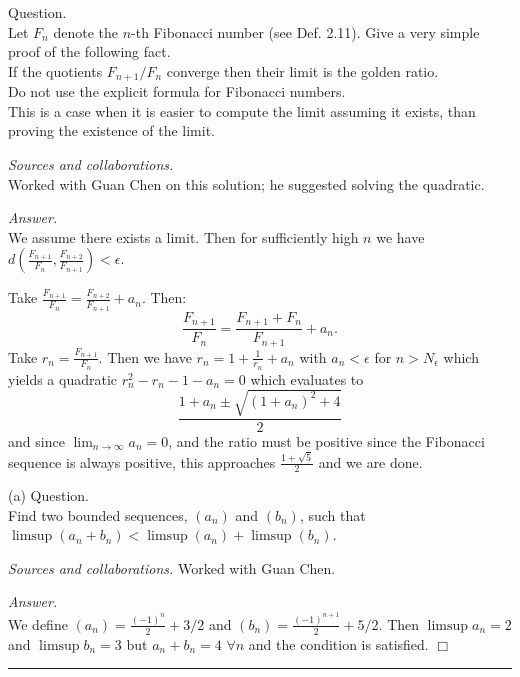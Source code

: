 \documentclass{amsart}
\begin{document}
\vspace{0.6cm}

\newpage
\Large
{}      %

 Question. \\
Let $F_n$ denote the $n$-th Fibonacci number (see Def. 2.11). Give a very simple proof of the following fact. \\
If the quotients $F_{n+1}/F_n$ converge then their limit is the golden ratio.\\
Do not use the explicit formula for Fibonacci numbers. \\
This is a case when it is easier to compute the limit assuming it exists, than proving the existence of the limit.

\medskip\noindent
\emph{Sources and collaborations.}\\
Worked with Guan Chen on this solution; he suggested solving the quadratic.

\medskip\noindent
\emph{Answer.}\\
We assume there exists a limit. Then for sufficiently high $n$ we have $d(\frac{F_{n+1}}{F_n},\frac{F_{n+2}}{F_{n+1}})<\epsilon$.

\medskip \noindent Take $\frac{F_{n+1}}{F_n}=\frac{F_{n+2}}{F_{n+1}}+a_n$. Then:
\[\frac{F_{n+1}}{F_n}=\frac{F_{n+1}+F_n}{F_{n+1}}+a_n.\]
Take $r_n=\frac{F_{n+1}}{F_n}$. Then we have $r_n = 1+\frac{1}{r_n}+a_n$ with $a_n<\epsilon$ for $n>N_\epsilon$ which yields a quadratic $r_n^2-r_n-1-a_n=0$ which evaluates to \[\frac{1+a_n\pm\sqrt{(1+a_n)^2+4}}{2}\]
and since $\lim_{n\to\infty}a_n=0$, and the ratio must be positive since the Fibonacci sequence is always positive, this approaches $\frac{1+\sqrt{5}}{2}$ and we are done.

\newpage
{}

(a) Question.\\
Find two bounded sequences, $(a_n)$ and $(b_n)$, such that $\limsup(a_n+b_n)<\limsup(a_n)+\limsup(b_n)$.

\medskip\noindent
\emph{Sources and collaborations.} 
Worked with Guan Chen.

\medskip\noindent
\emph{Answer.}\\
We define $(a_n)=\frac{(-1)^n}{2}+3/2$ and $(b_n)=\frac{(-1)^{n+1}}{2}+5/2$. Then
$\limsup a_n=2$ and $\limsup b_n = 3$ but $a_n+b_n = 4$ $\forall n$ and the condition is satisfied. \hfill $\Box$

\bigskip\hrule
\vspace{0.5cm}
\end{document}
